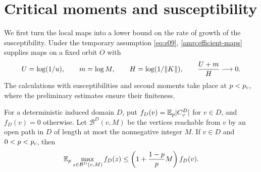 \section{Critical moments and susceptibility}
\label{mom:section}

We first turn the local maps into a lower bound on the rate of growth of
the susceptibility.  Under the temporary assumption \eqref{eq:s09},
\cref{amp:efficient-maps} supplies maps on a fixed orbit $O$ with
\[
 U=\log(1/u),\qquad m=\log M,\qquad H=\log(1/\lVert K\rVert),
 \qquad \frac{U+m}{H}\longrightarrow0.
\]
The calculations with susceptibilities and second moments take place
at $p<{p_c}$, where the preliminary estimates ensure their finiteness.

\begin{lemma}
\label{mom:maximal-potential}
For a deterministic induced domain $D$, put
$f_D(v)=\mathbb E_p\lvert C_v^D\rvert$ for $v\in D$, and $f_D(v)=0$ otherwise.
Let $\mathcal B^D(v,M)$ be the vertices reachable from $v$ by an open
path in $D$ of length at most the nonnegative integer $M$.  If $v\in D$
and $0<p<{p_c}$, then
\begin{equation}
 \mathbb E_p\max_{z\in\mathcal B^D(v,M)}f_D(z)
 \le \left(1+\frac{1-p}{p}M\right)f_D(v).
 \label{eq:s16}
\end{equation}
\end{lemma}


